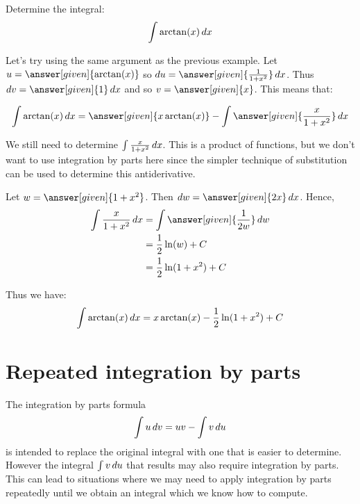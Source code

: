 \documentclass{ximera}
\begin{document}
\begin{example}
Determine the integral:
\[ 
\int \arctan(x) \mathop{}\!d x
\]
\begin{explanation}
Let's try using the same argument as the previous example.  Let $u=\answer[given]{\arctan (x)}$ so $\d u=\answer[given]{\frac{1}{1+x^{2}} } \d x$. Thus $\d v=\answer[given]{1} \d x$ and so $v=\answer[given]{x}$. 
This means that:

\[
\int \arctan(x) \d x= \answer[given]{x\arctan(x)}- \int \answer[given]{\frac{x}{1+x^{2}}} \d x
\]

We still need to determine $\int \frac{x}{1+x^{2}} \mathop{}\!d x$. This is a product of functions, but we don't want to use integration by parts here since the simpler technique of substitution can be used to determine this antiderivative. 

Let $w=\answer[given]{1+x^{2}}$. Then $\d w=\answer[given]{2 x} \d x$. Hence, 
\begin{align*}
\int \frac{x}{1+x^{2}} \d x &= \int \answer[given]{\frac{1}{2 w}} \d w \\
&= \frac{1}{2} \ln(w) + C\\
&=\frac{1}{2} \ln(1+x^{2})+C 
\end{align*}

Thus we have:
\[ 
\int \arctan(x) \mathop{}\!d x = x \arctan(x) -\frac{1}{2} \ln(1+x^{2}) +C
\]
\end{explanation}
\end{example}






\section{Repeated integration by parts}

The  integration by parts formula
 \[
\int u \mathop{}\!d v= uv - \int v \mathop{}\!d u
\]
 is intended to replace the original integral with one that is easier to determine. However the integral $\int v \mathop{}\!d u$ that results may also require integration by parts. This can lead to situations where we may need to apply integration by parts repeatedly until we obtain an integral which we know how to compute. 


%
\end{document}
